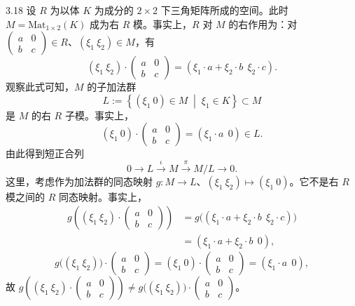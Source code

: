 
\begin{example}{3.18}
设 $R$ 为以体 $K$ 为成分的 $2\times 2$ 下三角矩阵所成的空间。此时 $M=\mathrm{Mat}_{1\times2}(K)$ 成为右 $R$ 模。事实上，$R$ 对 $M$ 的右作用为：对 $\begin{pmatrix}a&0\\b&c\end{pmatrix}\in R$、$(\xi_1\ \xi_2)\in M$，有
\[
(\xi_1\ \xi_2)\cdot\begin{pmatrix}a&0\\b&c\end{pmatrix}
=(\xi_1\cdot a+\xi_2\cdot b\ \ \xi_2\cdot c).
\]
观察此式可知，$M$ 的子加法群
\[
L:=\left\{(\xi_1\ 0)\in M \;\middle|\; \xi_1\in K\right\}\subset M
\]
是 $M$ 的右 $R$ 子模。事实上，
\[
(\xi_1\ 0)\cdot\begin{pmatrix}a&0\\b&c\end{pmatrix}=(\xi_1\cdot a\ \ 0)\in L.
\]
由此得到短正合列
\[
0\to L\xrightarrow{\iota}M\xrightarrow{\pi}M/L\to 0.
\]
这里，考虑作为加法群的同态映射 $g\colon M\to L$、$(\xi_1\ \xi_2)\mapsto(\xi_1\ 0)$。它不是右 $R$ 模之间的 $R$ 同态映射。事实上，
\[
\begin{aligned}
g\left((\xi_1\ \xi_2)\cdot\begin{pmatrix}a&0\\b&c\end{pmatrix}\right)
&=g\big((\xi_1\cdot a+\xi_2\cdot b\ \ \xi_2\cdot c)\big)\\
&=(\xi_1\cdot a+\xi_2\cdot b\ \ 0),
\end{aligned}
\]
\[
g\big((\xi_1\ \xi_2)\big)\cdot\begin{pmatrix}a&0\\b&c\end{pmatrix}
=(\xi_1\ 0)\cdot\begin{pmatrix}a&0\\b&c\end{pmatrix}=(\xi_1\cdot a\ \ 0),
\]
故 $g\left((\xi_1\ \xi_2)\cdot\begin{pmatrix}a&0\\b&c\end{pmatrix}\right)\neq g\big((\xi_1\ \xi_2)\big)\cdot\begin{pmatrix}a&0\\b&c\end{pmatrix}$。


\end{example}
